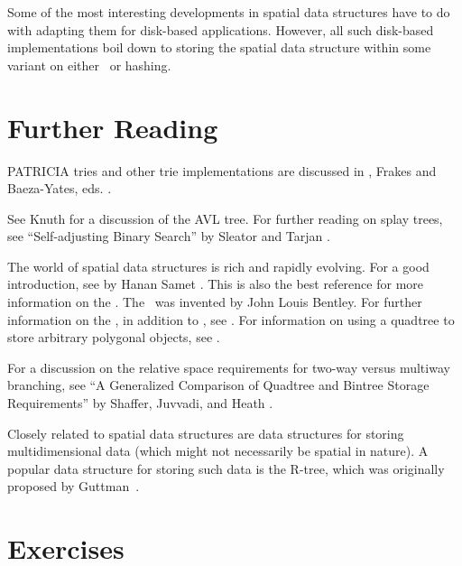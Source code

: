 Some of the most interesting developments in spatial data structures
have to do with adapting them for disk-based applications.
However, all such disk-based implementations boil down to storing the
spatial data structure within some variant
on either \Btrees\ or
hashing.

\section{Further Reading}
\label{TreeRead}

PATRICIA tries and other trie
implementations are discussed in
,
Frakes and Baeza-Yates, eds. \cite{InfoRet}.

See Knuth \cite{KnuthV1} for a discussion of the AVL tree.
For further reading on splay trees,
see ``Self-adjusting Binary Search''
by Sleator and Tarjan \cite{SplayRef}.

The world of spatial data structures is rich and rapidly
evolving.
For a good introduction, see 
by Hanan Samet \cite{SametNew}.
This is also the best reference for more information on the
\PRquad.
The \KDtree\ was invented by John Louis Bentley.
For further information on the \KDtree, in addition to \cite{SametNew},
see \cite{BentleyKD}.
For information on using a quadtree to store arbitrary polygonal
objects, see \cite{ShafferHerb}.

For a discussion on the relative space requirements for two-way versus
multiway branching, see
``A Generalized Comparison of Quadtree and Bintree Storage
Requirements'' by Shaffer, Juvvadi, and Heath \cite{BinQuadSpace}.

Closely related to spatial data structures are data structures for
storing multidimensional data (which might not necessarily be spatial
in nature).
A popular data structure for storing such data is the R-tree,
which was originally proposed by Guttman~\cite{Guttm84}.

\section{Exercises}

